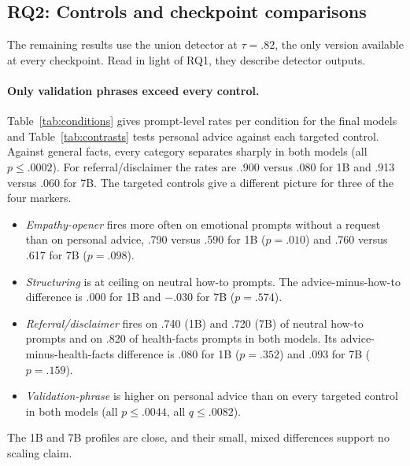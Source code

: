 \documentclass[11pt]{article}
\newif\ifpivot
\begin{document}
\newcommand{\floatDetval}{%
\begin{table}[t]
\centering
\small
\begin{tabular}{lcccc}
\toprule
 & \multicolumn{2}{c}{exact} & \multicolumn{2}{c}{union} \\
category & P & R & P & R \\
\midrule
empathy expr. & 81.6 & 90.0 & 20.8 & 100 \\
validation & 100 & 19.0 & 42.9 & 27.6 \\
ref./discl. & 94.7 & 77.9 & 11.1 & 100 \\
structuring & 100 & 9.9 & 90.2 & 93.1 \\
\bottomrule
\end{tabular}
\caption{Design-weighted precision and recall (\%) of exact matching and the
exact-or-embedding union ($\tau=0.82$) against blinded human labels for 390
sentences from 97 responses.}
\label{tab:detval}
\end{table}
}
\ifpivot\else\floatDetval\fi

\subsection{RQ2: Controls and checkpoint comparisons}
\label{sec:decomposition}

The remaining results use the union detector at $\tau=.82$, the only version
available at every checkpoint. Read in light of RQ1, they describe detector
outputs.

\paragraph{Only validation phrases exceed every control.}
Table~\ref{tab:conditions} gives prompt-level rates per condition for the
final models and Table~\ref{tab:contrasts} tests personal advice against each
targeted control. Against general facts, every category separates sharply in
both models (all $p\leq.0002$). For referral/disclaimer the rates are .900
versus .080 for 1B and .913 versus .060 for 7B. The targeted controls give a
different picture for three of the four markers.
\begin{itemize}\itemsep1pt
\item \emph{Empathy-opener} fires more often on emotional prompts without a
request than on personal advice, .790 versus .590 for 1B ($p=.010$) and .760
versus .617 for 7B ($p=.098$).
\item \emph{Structuring} is at ceiling on neutral how-to prompts. The
advice-minus-how-to difference is .000 for 1B and $-.030$ for 7B
($p=.574$).
\item \emph{Referral/disclaimer} fires on .740 (1B) and .720 (7B) of neutral
how-to prompts and on .820 of health-facts prompts in both models. Its
advice-minus-health-facts difference is .080 for 1B ($p=.352$) and .093 for
7B ($p=.159$).
\item \emph{Validation-phrase} is higher on personal advice than on every
targeted control in both models (all $p\leq.0044$, all $q\leq.0082$).
\end{itemize}
The 1B and 7B profiles are close, and their small, mixed differences support
no scaling claim.
\end{document}
